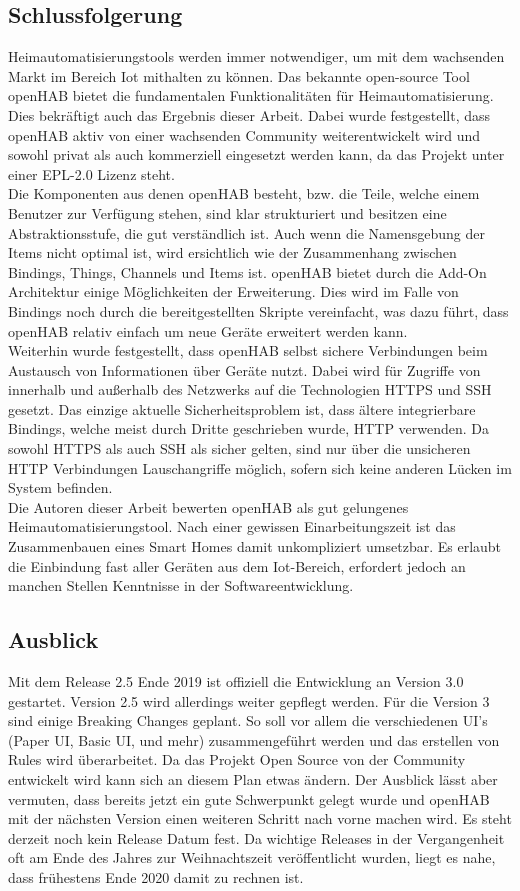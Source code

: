 \subsection{Schlussfolgerung}
Heimautomatisierungstools werden immer notwendiger, um mit dem wachsenden Markt im Bereich Iot mithalten zu können.\cite{STATISTA01:IOT} Das bekannte open-source Tool openHAB bietet die fundamentalen Funktionalitäten für Heimautomatisierung. Dies bekräftigt auch das Ergebnis dieser Arbeit. Dabei wurde festgestellt, dass openHAB aktiv von einer wachsenden Community weiterentwickelt wird und sowohl privat als auch kommerziell eingesetzt werden kann, da das Projekt unter einer EPL-2.0 Lizenz steht.\\
Die Komponenten aus denen openHAB besteht, bzw. die Teile, welche einem Benutzer zur Verfügung stehen, sind klar strukturiert und besitzen eine Abstraktionsstufe, die gut verständlich ist. Auch wenn die Namensgebung der Items nicht optimal ist, wird ersichtlich wie der Zusammenhang zwischen Bindings, Things, Channels und Items ist. openHAB bietet durch die Add-On Architektur einige Möglichkeiten der Erweiterung. Dies wird im Falle von Bindings noch durch die bereitgestellten Skripte vereinfacht, was dazu führt, dass openHAB relativ einfach um neue Geräte erweitert werden kann.\\
Weiterhin wurde festgestellt, dass openHAB selbst sichere Verbindungen beim Austausch von Informationen über Geräte nutzt. Dabei wird für Zugriffe von innerhalb und außerhalb des Netzwerks auf die Technologien HTTPS und SSH gesetzt. Das einzige aktuelle Sicherheitsproblem ist, dass ältere integrierbare Bindings, welche meist durch Dritte geschrieben wurde, HTTP verwenden. Da sowohl HTTPS als auch SSH als sicher gelten, sind nur über die unsicheren HTTP Verbindungen Lauschangriffe möglich, sofern sich keine anderen Lücken im System befinden.
\\
Die Autoren dieser Arbeit bewerten openHAB als gut gelungenes Heimautomatisierungstool. Nach einer gewissen Einarbeitungszeit ist das Zusammenbauen eines Smart Homes damit unkompliziert umsetzbar. Es erlaubt die Einbindung fast aller Geräten aus dem Iot-Bereich, erfordert jedoch an manchen Stellen Kenntnisse in der Softwareentwicklung.


\subsection{Ausblick}
Mit dem Release 2.5 Ende 2019 ist offiziell die Entwicklung an Version 3.0 gestartet. Version 2.5 wird allerdings weiter gepflegt werden. Für die Version 3 sind einige Breaking Changes geplant. So soll vor allem die verschiedenen UI's (Paper UI, Basic UI, und mehr) zusammengeführt werden und das erstellen von Rules wird überarbeitet.\cite{openHAB02:OH} Da das Projekt Open Source von der Community entwickelt wird kann sich an diesem Plan etwas ändern. Der Ausblick lässt aber vermuten, dass bereits jetzt ein gute Schwerpunkt gelegt wurde und openHAB mit der nächsten Version einen weiteren Schritt nach vorne machen wird. Es steht derzeit noch kein Release Datum fest. Da wichtige Releases in der Vergangenheit oft am Ende des Jahres zur Weihnachtszeit veröffentlicht wurden, liegt es nahe, dass frühestens Ende 2020 damit zu rechnen ist.

